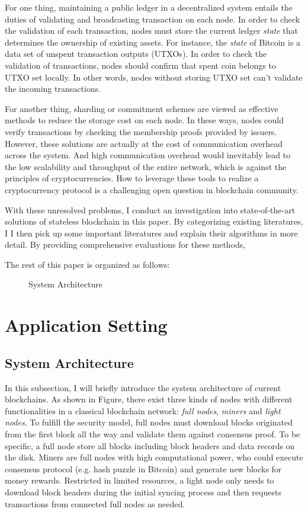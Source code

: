 \documentclass[conference]{IEEEtran}
\begin{document}
For one thing, maintaining a public ledger in a decentralized system entails the duties of validating and broadcasting transaction on each node.
%
In order to check the validation of each transaction, nodes must store the current ledger \textit{state} that determines the ownership of existing assets.
%
For instance, the \textit{state} of Bitcoin is a data set of unspent transaction outputs (UTXOs). 
%
In order to check the validation of transactions, nodes should confirm that spent coin belongs to UTXO set locally.
%
In other words, nodes without storing UTXO set can't validate the incoming transactions.

For another thing, sharding or commitment schemes are viewed as effective methods to reduce the storage cost on each node.
%
In these ways, nodes could verify transactions by checking the membership proofs provided by issuers.
%
However, these solutions are actually at the cost of communication overhead across the system.
%
And high communication overhead would inevitably lead to the low scalability and throughput of the entire network, which is against the principles of cryptocurrencies.
%
How to leverage these tools to realize a cryptocurrency protocol is a challenging open question in blockchain community.

With these unresolved problems, I conduct an investigation into state-of-the-art solutions of stateless blockchain in this paper.
%
By categorizing existing literatures, I
%
I then pick up some important literatures and explain their algorithms in more detail.
%
By providing comprehensive evaluations for these methods, 

The rest of this paper is organized as follows: 


\begin{figure}[t]
  \centering
  \resizebox{0.7\linewidth}{!}{}
  \caption{System Architecture}\label{fig:model}
\end{figure}

\section{Application Setting}
\subsection{System Architecture}
In this subsection, I will briefly introduce the system architecture of current blockchains.
%
As shown in Figure, there exist three kinds of nodes with different functionalities in a classical blockchain network:
\textit{full nodes}, \textit{miners} and \textit{light nodes}.
%
To fulfill the security model, full nodes must download blocks originated from the first block all the way and validate them against consensus proof.
%
To be specific, a full node store all blocks including block headers and data records on the disk.
%
Miners are full nodes with high computational power, who could execute consensus protocol (e.g. hash puzzle in Bitcoin) and generate new blocks for money rewards.
%
Restricted in limited resources, a light node only needs to download block headers during the initial syncing process and then requests transactions from connected full nodes as needed.
\end{document}
